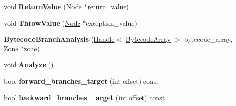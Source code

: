\begin{DoxyCompactItemize}
\item 
void {\bfseries Return\+Value} (\hyperlink{classv8_1_1internal_1_1compiler_1_1_node}{Node} $\ast$return\+\_\+value)\hypertarget{classv8_1_1internal_1_1compiler_1_1_b_a_s_e___e_m_b_e_d_d_e_d_ac42fa42978327337fe33741e5eabbd74}{}\label{classv8_1_1internal_1_1compiler_1_1_b_a_s_e___e_m_b_e_d_d_e_d_ac42fa42978327337fe33741e5eabbd74}

\item 
void {\bfseries Throw\+Value} (\hyperlink{classv8_1_1internal_1_1compiler_1_1_node}{Node} $\ast$exception\+\_\+value)\hypertarget{classv8_1_1internal_1_1compiler_1_1_b_a_s_e___e_m_b_e_d_d_e_d_ace48c23596fcc049fc65500714f8ca17}{}\label{classv8_1_1internal_1_1compiler_1_1_b_a_s_e___e_m_b_e_d_d_e_d_ace48c23596fcc049fc65500714f8ca17}

\item 
{\bfseries Bytecode\+Branch\+Analysis} (\hyperlink{classv8_1_1internal_1_1_handle}{Handle}$<$ \hyperlink{classv8_1_1internal_1_1_bytecode_array}{Bytecode\+Array} $>$ bytecode\+\_\+array, \hyperlink{classv8_1_1internal_1_1_zone}{Zone} $\ast$zone)\hypertarget{classv8_1_1internal_1_1compiler_1_1_b_a_s_e___e_m_b_e_d_d_e_d_aba9d7ebba650829c93982d48d84351fc}{}\label{classv8_1_1internal_1_1compiler_1_1_b_a_s_e___e_m_b_e_d_d_e_d_aba9d7ebba650829c93982d48d84351fc}

\item 
void {\bfseries Analyze} ()\hypertarget{classv8_1_1internal_1_1compiler_1_1_b_a_s_e___e_m_b_e_d_d_e_d_a8b881780ad38741a471cf5ffdd64ab69}{}\label{classv8_1_1internal_1_1compiler_1_1_b_a_s_e___e_m_b_e_d_d_e_d_a8b881780ad38741a471cf5ffdd64ab69}

\item 
bool {\bfseries forward\+\_\+branches\+\_\+target} (int offset) const \hypertarget{classv8_1_1internal_1_1compiler_1_1_b_a_s_e___e_m_b_e_d_d_e_d_af91e5a03648eabeceeb4540bd53f61d4}{}\label{classv8_1_1internal_1_1compiler_1_1_b_a_s_e___e_m_b_e_d_d_e_d_af91e5a03648eabeceeb4540bd53f61d4}

\item 
bool {\bfseries backward\+\_\+branches\+\_\+target} (int offset) const \hypertarget{classv8_1_1internal_1_1compiler_1_1_b_a_s_e___e_m_b_e_d_d_e_d_a52b41e38af234e47c8e4e426b8243bcf}{}\label{classv8_1_1internal_1_1compiler_1_1_b_a_s_e___e_m_b_e_d_d_e_d_a52b41e38af234e47c8e4e426b8243bcf}

\end{DoxyCompactItemize}
